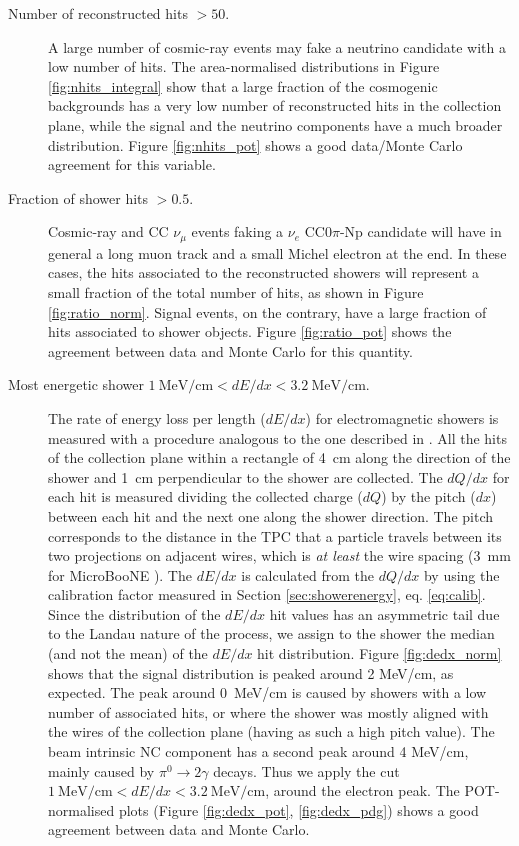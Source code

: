 \begin{description}
\item[Number of reconstructed hits $> 50$.] A large number of cosmic-ray events may fake a neutrino candidate with a low number of hits. 
The area-normalised distributions in Figure \ref{fig:nhits_integral} show that a large fraction of the cosmogenic backgrounds has a very low number of reconstructed hits in the collection plane, while the signal and the neutrino components have a much broader distribution. Figure \ref{fig:nhits_pot} shows a good data/Monte Carlo agreement for this variable.

\item[{Fraction of shower hits $> 0.5$.}] {Cosmic-ray and CC $\nu_{\mu}$ events faking a $\nu_{e}$ CC0$\pi$-Np candidate will have in general a long muon track and a small Michel electron at the end. In these cases, the hits associated to the reconstructed showers will represent a small fraction of the total number of hits, as shown in Figure \ref{fig:ratio_norm}. Signal events, on the contrary, have a large fraction of hits associated to shower objects. Figure \ref{fig:ratio_pot} shows the agreement between data and Monte Carlo for this quantity.}



\item[Most energetic shower $1~\mathrm{MeV/cm} < dE/dx <3.2~\mathrm{MeV/cm}$.] The rate of energy loss per length ($dE/dx$) for electromagnetic showers is measured with a procedure analogous to the one described in \cite{argoneut}. All the hits of the collection plane within a rectangle of 4~cm along the direction of the shower and 1~cm perpendicular to the shower are collected. 
The $dQ/dx$ for each hit is measured dividing the collected charge ($dQ$) by the pitch ($dx$) between each hit and the next one along the shower direction. The pitch corresponds to the distance in the TPC that a particle travels between its two projections  on adjacent wires, which is \emph{at least} the wire spacing (3~mm for MicroBooNE \cite{detector}). 
The $dE/dx$ is calculated from the $dQ/dx$ by using the calibration factor measured in Section \ref{sec:showerenergy}, eq. \eqref{eq:calib}.
Since the distribution of the $dE/dx$ hit values has an asymmetric tail due to the Landau nature of the process, we assign to the shower the median (and not the mean) of the $dE/dx$ hit distribution.
Figure \ref{fig:dedx_norm} shows that the signal distribution is peaked around 2 MeV/cm, as expected. The peak around 0~MeV/cm is caused by showers with a low number of associated hits, or where the shower was mostly aligned with the wires of the collection plane (having as such a high pitch value). The beam intrinsic NC component has a second peak around 4 MeV/cm, mainly caused by $\pi^0\rightarrow2\gamma$ decays. Thus we apply the cut $1~\mathrm{MeV/cm} < dE/dx <3.2~\mathrm{MeV/cm}$, around the electron peak. The POT-normalised plots (Figure \ref{fig:dedx_pot}, \ref{fig:dedx_pdg}) shows a good agreement between data and Monte Carlo.



\end{description}
